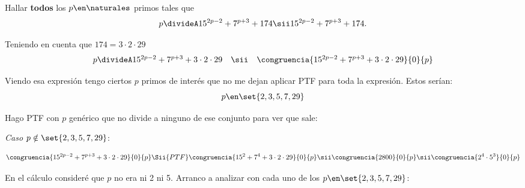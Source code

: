 \begin{enunciado}{\ejExtra}
  Hallar \textbf{todos} los $p \en \naturales$ primos tales que
  $$
    p \divideA 15^{2p-2} + 7^{p+3} + 174
    \sii
    15^{2p-2} + 7^{p+3} + 174.
  $$
\end{enunciado}

Teniendo en cuenta que $174 = 3 \cdot 2 \cdot 29$
$$
  \begin{array}{rcl}
    p \divideA 15^{2p-2} + 7^{p+3} + 3 \cdot 2 \cdot 29
     & \sii &
    \congruencia{15^{2p-2} + 7^{p+3} +3 \cdot 2 \cdot 29}{0}{p}
  \end{array}
$$

Viendo esa expresión tengo ciertos $p$ primos de interés que no me dejan aplicar PTF para toda la expresión. Estos serían:
$$
  p \en \set{2, 3, 5, 7, 29}
$$

Hago PTF con $p$ genérico que no divide a ninguno de ese conjunto para ver que sale:

\textit{Caso $p \notin\set{2, 3, 5, 7, 29}$}:\par
$$
  \congruencia{15^{2p-2} + 7^{p+3} +3 \cdot 2 \cdot 29}{0}{p}
  \Sii{PTF}
  \congruencia{15^2 + 7^4 + 3 \cdot 2 \cdot 29}{0}{p}
  \sii
  \congruencia{2800}{0}{p}
  \sii
  \congruencia{2^4 \cdot 5^3}{0}{p}
$$

En el cálculo consideré que $p$ no era ni 2 ni 5. Arranco a analizar con cada uno de los  $p \en \set{2, 3, 5, 7, 29}$:

